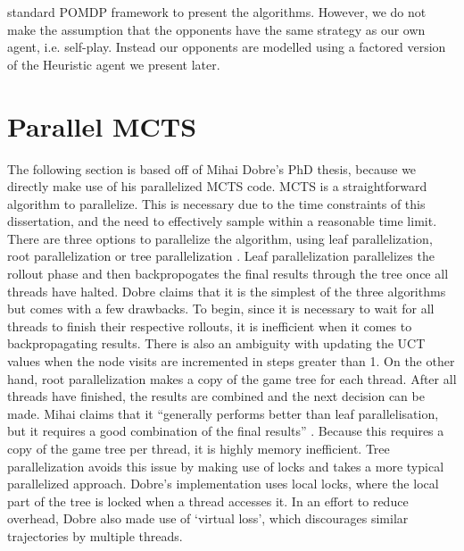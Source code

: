 \documentclass[msc, deptreport, ai, romanprepages]{infthesis}
\begin{document}
standard POMDP framework to present the algorithms. However, we do not make the assumption that the opponents have the same strategy as our own agent, i.e. self-play. Instead our opponents are modelled using a factored version of the Heuristic agent we present later.

\section{Parallel MCTS}
The following section is based off of Mihai Dobre’s PhD thesis, because we directly make use of his parallelized MCTS code. MCTS is a straightforward algorithm to parallelize. This is necessary due to the time constraints of this dissertation, and the need to effectively sample within a reasonable time limit. There are three options to parallelize the algorithm, using leaf parallelization, root parallelization or tree parallelization \cite{Mihai}. Leaf parallelization parallelizes the rollout phase and then backpropogates the final results through the tree once all threads have halted. Dobre claims that it is the simplest of the three algorithms but comes with a few drawbacks. To begin, since it is necessary to wait for all threads to finish their respective rollouts, it is inefficient when it comes to backpropagating results. There is also an ambiguity with updating the UCT values when the node visits are incremented in steps greater than 1. On the other hand, root parallelization makes a copy of the game tree for each thread. After all threads have finished, the results are combined and the next decision can be made. Mihai claims that it “generally performs better than leaf parallelisation, but it requires a good combination of the final results” \cite{Mihai}. Because this requires a copy of the game tree per thread, it is highly memory inefficient. Tree parallelization avoids this issue by making use of locks and takes a more typical parallelized approach. Dobre’s implementation uses local locks, where the local part of the tree is locked when a thread accesses it. In an effort to reduce overhead, Dobre also made use of ‘virtual loss’, which discourages similar trajectories by multiple threads.
\end{document}
